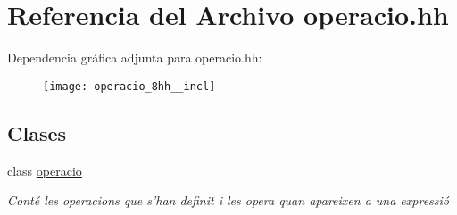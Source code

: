 \hypertarget{operacio_8hh}{}\section{Referencia del Archivo operacio.\+hh}
\label{operacio_8hh}
Dependencia gráfica adjunta para operacio.\+hh\+:\nopagebreak
\begin{figure}[H]
\begin{center}
\leavevmode
\texttt{[image: operacio\_8hh\_\_incl]}
\end{center}
\end{figure}
\subsection*{Clases}
\begin{DoxyCompactItemize}
\item 
class \hyperlink{classoperacio}{operacio}
\begin{DoxyCompactList}\small\item\em Conté les operacions que s’han definit i les opera quan apareixen a una expressió \end{DoxyCompactList}\end{DoxyCompactItemize}
